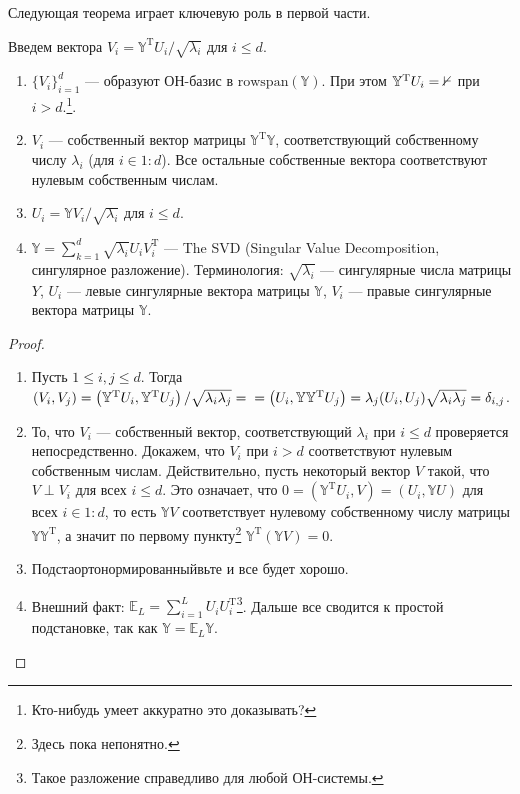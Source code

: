 Следующая теорема играет ключевую роль в первой части.
\begin{thm}\label{thm::SVD}
    Введем вектора $V_i = \mathbb Y^\mathrm T U_i / \sqrt{\lambda_i}$ для $i \leqslant d$. 
    \begin{enumerate}
        \item $\{V_i\}_{i = 1}^d$ --- образуют ОН-базис в $\mathrm{rowspan}(\mathbb Y)$. При этом $\mathbb Y^\mathrm T U_i = \mathbb{0}$ при $i>d$.\footnote{\color{blue} Кто-нибудь умеет аккуратно это доказывать?}.
        \item $V_i$ --- собственный вектор матрицы $\mathbb Y^\mathrm T \mathbb Y$, соответствующий собственному числу $\lambda_i$ (для $i \in 1:d$).
              Все остальные собственные вектора соответствуют нулевым собственным числам.
        \item $U_i = \mathbb Y V_i / \sqrt{\lambda_i}$ для $i \leqslant d$.
        \item $\mathbb Y = \sum_{k = 1}^d \sqrt{\lambda_i} U_i V_i^\mathrm T$ --- The SVD (Singular Value Decomposition, сингулярное разложение). Терминология: $\sqrt{\lambda_i}$ --- сингулярные числа матрицы $Y$,
              $U_i$ --- левые сингулярные вектора матрицы $\mathbb Y$, $V_i$ --- правые сингулярные вектора матрицы $\mathbb Y$.
    \end{enumerate}
\end{thm}

\begin{proof}
    \begin{enumerate}
        \item Пусть $1 \leqslant i, j \leqslant d$. Тогда $(V_i, V_j) = \left(\mathbb Y^\mathrm T U_i, \mathbb Y^\mathrm T U_j\right) / \sqrt{\lambda_i \lambda_j}= \\ =
              \left(U_i, \mathbb Y \mathbb Y^\mathrm T U_j\right) = \lambda_j (U_i, U_j) \sqrt{\lambda_i \lambda_j} = \delta_{i,j}$.
        \item То, что $V_i$ --- собственный вектор, соответствующий $\lambda_i$ при $i \leqslant d$ проверяется непосредственно. Докажем, что
              $V_i$ при $i > d$ соответствуют нулевым собственным числам. Действительно, пусть некоторый вектор $V$ такой, что $V \perp V_i$ для всех $i \leqslant d$.
              Это означает, что $0 = (\mathbb Y^\mathrm T U_i, V) = (U_i, \mathbb Y U)$ для всех $i \in 1:d$, то есть $\mathbb Y V$ соответствует нулевому собственному числу матрицы $\mathbb Y \mathbb Y^\mathrm T$,
              а значит по первому пункту\footnote{\color{blue} Здесь пока непонятно.}
              $\mathbb Y^\mathrm T (\mathbb Y V) =0$.
        \item Подстаортонормированныйвьте и все будет хорошо.
        \item Внешний факт: $\mathbb E_{L} = \sum_{i=1}^L U_i U_i^\mathrm T$\footnote{Такое разложение справедливо для любой ОН-системы.}.
              Дальше все сводится к простой подстановке, так как $\mathbb Y = \mathbb E_L \mathbb Y$.
    \end{enumerate}          
\end{proof}

